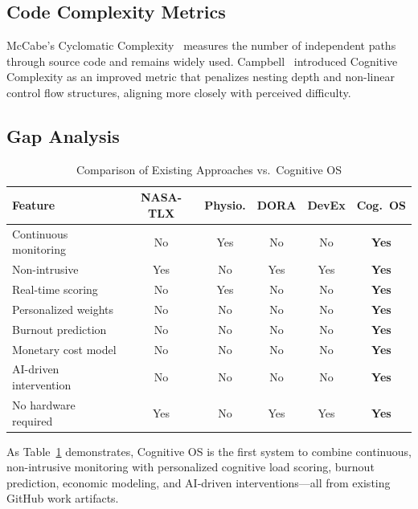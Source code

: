 \documentclass[12pt]{article}
\begin{document}
\subsection{Code Complexity Metrics}

McCabe's Cyclomatic Complexity~\cite{mccabe1976complexity} measures the number of independent paths through source code and remains widely used. Campbell~\cite{campbell2018cognitive} introduced Cognitive Complexity as an improved metric that penalizes nesting depth and non-linear control flow structures, aligning more closely with perceived difficulty.

\subsection{Gap Analysis}

\begin{table}[H]
\centering
\caption{Comparison of Existing Approaches vs.\ Cognitive OS}
\label{tab:gap}
\begin{tabular}{@{}p{3.2cm}ccccc@{}}
\toprule
\textbf{Feature} & \textbf{NASA-TLX} & \textbf{Physio.} & \textbf{DORA} & \textbf{DevEx} & \textbf{Cog.\ OS} \\
\midrule
Continuous monitoring    & No  & Yes & No  & No  & \textbf{Yes} \\
Non-intrusive            & Yes & No  & Yes & Yes & \textbf{Yes} \\
Real-time scoring        & No  & Yes & No  & No  & \textbf{Yes} \\
Personalized weights     & No  & No  & No  & No  & \textbf{Yes} \\
Burnout prediction       & No  & No  & No  & No  & \textbf{Yes} \\
Monetary cost model      & No  & No  & No  & No  & \textbf{Yes} \\
AI-driven intervention   & No  & No  & No  & No  & \textbf{Yes} \\
No hardware required     & Yes & No  & Yes & Yes & \textbf{Yes} \\
\bottomrule
\end{tabular}
\end{table}

As Table~\ref{tab:gap} demonstrates, Cognitive OS is the first system to combine continuous, non-intrusive monitoring with personalized cognitive load scoring, burnout prediction, economic modeling, and AI-driven interventions---all from existing GitHub work artifacts.

\newpage
\end{document}
